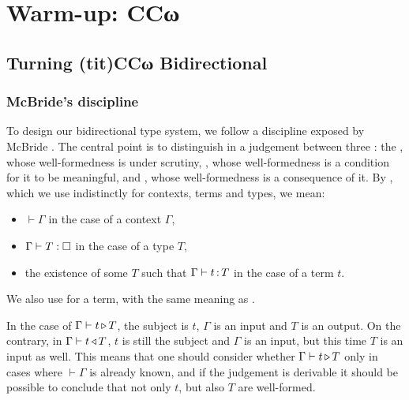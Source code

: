 \chapter{Warm-up: CCω}
\label{chap:bidir-ccw}

\margintoc


\section{Turning \kl(tit){CCω} Bidirectional}
\label{sec:bidir-ccw}

\subsection{McBride’s discipline}

\AP To design our bidirectional type system, we follow a discipline exposed by McBride
.
The central point is to distinguish in a judgement between three :
the ,
whose well-formedness is under scrutiny, ,
whose well-formedness is a condition for it to be meaningful,
and , whose well-formedness is a consequence of it.
By , which we use indistinctly for contexts, terms and types,
we mean:
\begin{itemize}
  \item $\vdash \Gamma$ in the case of a context $\Gamma$,
  \item $\Gamma \vdash T : \uni$ in the case of a type $T$,
  \item the existence of some $T$ such that $\Gamma \vdash t \operatorname{:} T$ in the case of a term $t$.
\end{itemize}
We also use  for a term, with the same meaning as .

\AP In the case of  $\Gamma \vdash t \operatorname{\triangleright} T$, the subject is $t$,
$\Gamma$ is an input and $T$ is an output.
On the contrary, in  $\Gamma \vdash t \operatorname{\triangleleft} T$, $t$ is still the subject
and $\Gamma$ is an input, but this time $T$ is an input as well.
This means that one should consider whether $\Gamma \vdash t \operatorname{\triangleright} T$
only in cases where $\vdash \Gamma$ is already known,
and if the judgement is derivable it should be possible to conclude that
not only $t$, but also $T$ are well-formed.


